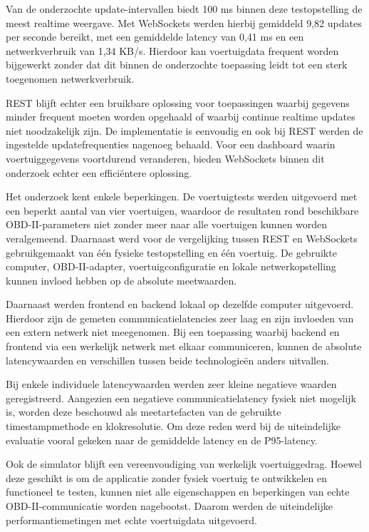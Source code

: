 Van de onderzochte update-intervallen biedt 100 ms binnen deze testopstelling
de meest realtime weergave. Met WebSockets werden hierbij gemiddeld
9,82 updates per seconde bereikt, met een gemiddelde latency van 0,41 ms en
een netwerkverbruik van 1,34 KB/s. Hierdoor kan voertuigdata frequent worden
bijgewerkt zonder dat dit binnen de onderzochte toepassing leidt tot een sterk
toegenomen netwerkverbruik.

REST blijft echter een bruikbare oplossing voor toepassingen waarbij gegevens
minder frequent moeten worden opgehaald of waarbij continue realtime updates
niet noodzakelijk zijn. De implementatie is eenvoudig en ook bij REST werden
de ingestelde updatefrequenties nagenoeg behaald. Voor een dashboard waarin
voertuiggegevens voortdurend veranderen, bieden WebSockets binnen dit onderzoek
echter een efficiëntere oplossing.

Het onderzoek kent enkele beperkingen. De voertuigtests werden uitgevoerd met
een beperkt aantal van vier voertuigen, waardoor de resultaten rond beschikbare
OBD-II-parameters niet zonder meer naar alle voertuigen kunnen worden
veralgemeend. Daarnaast werd voor de vergelijking tussen REST en WebSockets
gebruikgemaakt van één fysieke testopstelling en één voertuig. De gebruikte
computer, OBD-II-adapter, voertuigconfiguratie en lokale netwerkopstelling
kunnen invloed hebben op de absolute meetwaarden.

Daarnaast werden frontend en backend lokaal op dezelfde computer uitgevoerd.
Hierdoor zijn de gemeten communicatielatencies zeer laag en zijn invloeden van
een extern netwerk niet meegenomen. Bij een toepassing waarbij backend en
frontend via een werkelijk netwerk met elkaar communiceren, kunnen de absolute
latencywaarden en verschillen tussen beide technologieën anders uitvallen.

Bij enkele individuele latencywaarden werden zeer kleine negatieve waarden
geregistreerd. Aangezien een negatieve communicatielatency fysiek niet mogelijk
is, worden deze beschouwd als meetartefacten van de gebruikte timestampmethode
en klokresolutie. Om deze reden werd bij de uiteindelijke evaluatie vooral
gekeken naar de gemiddelde latency en de P95-latency.

Ook de simulator blijft een vereenvoudiging van werkelijk voertuiggedrag.
Hoewel deze geschikt is om de applicatie zonder fysiek voertuig te ontwikkelen
en functioneel te testen, kunnen niet alle eigenschappen en beperkingen van
echte OBD-II-communicatie worden nagebootst. Daarom werden de uiteindelijke
performantiemetingen met echte voertuigdata uitgevoerd.


